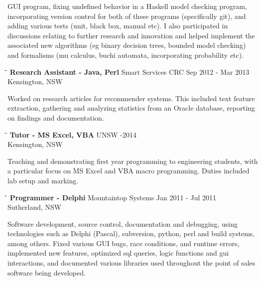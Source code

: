 \documentclass{res}
\begin{document}
\begin{resume}
    GUI program, fixing undefined behavior in a Haskell model checking program,
    incorporating version control for both of these programs (specifically
    git), and adding various tests (unit, black box, manual etc). I also
    participated in discussions relating to further research and innovation and
    helped implement the associated new algorithms (eg binary decision trees,
    bounded model checking) and formalisms (mu calculus, buchi automata,
    incorporating probability etc).
   \begin{tabbing}
   \hspace{2.3in}\= \hspace{2.6in}\= \kill %
    {\bf Research Assistant - Java, Perl} \>Smart Services CRC \>Sep 2012 - Mar 2013\\
                                          \>Kensington, NSW
   \end{tabbing}\vspace{-20pt}      %
    Worked on research articles for recommender systems. This included text
    feature extraction, gathering and analyzing statistics from an Oracle
    database, reporting on findings and documentation.
   \begin{tabbing}
   \hspace{2.3in}\= \hspace{2.6in}\= \kill %
    {\bf Tutor - MS Excel, VBA} \>UNSW     -2014\\
                                \>Kensington, NSW
   \end{tabbing}\vspace{-20pt}      %
    Teaching and demonstrating first year programming to engineering students,
    with a particular focus on MS Excel and VBA macro programming. Duties
    included lab setup and marking.
   \begin{tabbing}
   \hspace{2.3in}\= \hspace{2.6in}\= \kill %
    {\bf Programmer - Delphi} \>Mountaintop Systems \> Jan 2011 - Jul 2011\\
                              \>Sutherland, NSW
   \end{tabbing}\vspace{-20pt}
    Software development, source control, documentation and debugging,
    using technologies such as Delphi (Pascal), subversion, python, perl and
    build systems, among others. Fixed various GUI bugs, race conditions, and
    runtime errors, implemented new features, optimized sql queries, logic
    functions and gui interactions, and documented various libraries used
    throughout the point of sales software being developed.



\end{resume}
\end{document}
